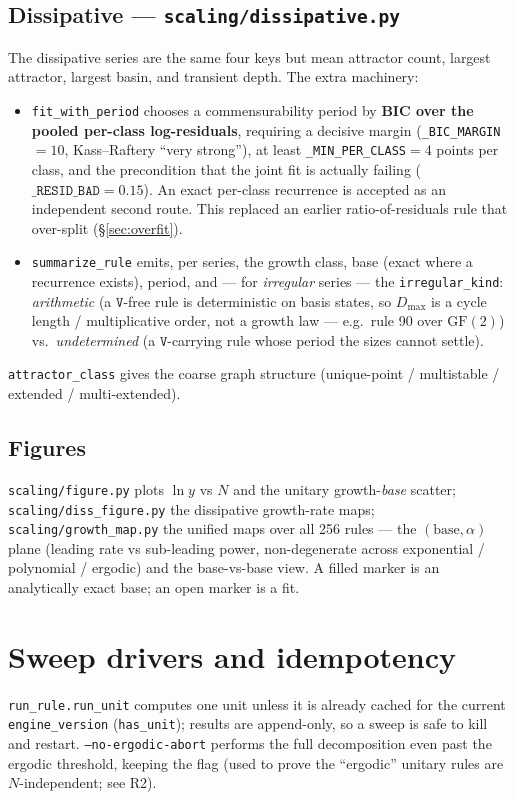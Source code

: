 \documentclass[11pt]{article}
\newcommand{\rt}[1]{\texttt{#1}}
\newcommand{\pf}[1]{\texttt{#1}}          %
\newcommand{\fn}[1]{\texttt{#1}}          %
\begin{document}
\subsection{Dissipative --- \pf{scaling/dissipative.py}}
The dissipative series are the same four keys but mean attractor count, largest
attractor, largest basin, and transient depth. The extra machinery:
\begin{itemize}
\item \fn{fit\_with\_period} chooses a commensurability period by \textbf{BIC over
  the pooled per-class log-residuals}, requiring a decisive margin
  (\fn{\_BIC\_MARGIN}$=10$, Kass--Raftery ``very strong''), at least
  \fn{\_MIN\_PER\_CLASS}$=4$ points per class, and the precondition that the
  joint fit is actually failing ($\fn{\_RESID\_BAD}=0.15$). An exact per-class
  recurrence is accepted as an independent second route. This replaced an
  earlier ratio-of-residuals rule that over-split (\S\ref{sec:overfit}).
\item \fn{summarize\_rule} emits, per series, the growth class, base (exact where
  a recurrence exists), period, and --- for \emph{irregular} series --- the
  \fn{irregular\_kind}: \emph{arithmetic} (a $\rt V$-free rule is deterministic
  on basis states, so $D_{\max}$ is a cycle length / multiplicative order, not a
  growth law --- e.g.\ rule 90 over $\mathrm{GF}(2)$) vs.\ \emph{undetermined}
  (a $\rt V$-carrying rule whose period the sizes cannot settle).
\end{itemize}
\fn{attractor\_class} gives the coarse graph structure (unique-point /
multistable / extended / multi-extended).

\subsection{Figures}
\pf{scaling/figure.py} plots $\ln y$ vs $N$ and the unitary growth-\emph{base}
scatter; \pf{scaling/diss\_figure.py} the dissipative growth-rate maps;
\pf{scaling/growth\_map.py} the unified maps over all 256 rules --- the
$(\text{base},\alpha)$ plane (leading rate vs sub-leading power, non-degenerate
across exponential / polynomial / ergodic) and the base-vs-base view. A filled
marker is an analytically exact base; an open marker is a fit.

\section{Sweep drivers and idempotency}
\label{sec:drivers}
\fn{run\_rule.run\_unit} computes one unit unless it is already cached for the
current \rt{engine\_version} (\fn{has\_unit}); results are append-only, so a
sweep is safe to kill and restart. \fn{--no-ergodic-abort} performs the full
decomposition even past the ergodic threshold, keeping the flag (used to prove
the ``ergodic'' unitary rules are $N$-independent; see R2).
\end{document}
